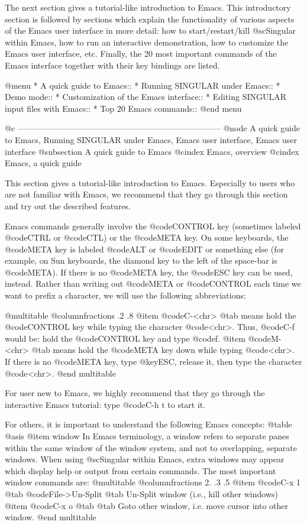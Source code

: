 The next section gives  a tutorial-like introduction to Emacs. This
introductory section is
followed by sections which explain the functionality of various aspects
of the Emacs user interface in more detail: how to start/restart/kill
@sc{Singular} within Emacs, how to run an interactive demonstration, how
to customize the Emacs user interface, etc. Finally, the 20 most
important commands of the Emacs interface together with their key
bindings are listed.

@menu
* A quick guide to Emacs::
* Running SINGULAR under Emacs::
* Demo mode::
* Customization of the Emacs interface::
* Editing SINGULAR input files with Emacs::
* Top 20 Emacs commands::
@end menu

@c --------------------------------------------------------------------------
@node A quick guide to Emacs, Running SINGULAR under Emacs, Emacs user interface, Emacs user interface
@subsection A quick guide to Emacs
@cindex Emacs, overview
@cindex Emacs, a quick guide

This section gives a tutorial-like introduction to Emacs. Especially to
users who are not familiar with Emacs, we recommend that they go through
this section and try out the described features.

Emacs commands generally involve the @code{CONTROL} key (sometimes
labeled @code{CTRL} or @code{CTL}) or the @code{META} key.  On some
keyboards, the @code{META} key is labeled @code{ALT} or @code{EDIT} or
something else (for example, on Sun keyboards, the diamond key to the
left of the space-bar is @code{META}).  If there is no @code{META} key,
the @code{ESC} key can be used, instead.  Rather than writing out
@code{META} or
@code{CONTROL} each time we want to prefix a character, we will use the
following abbreviations:

@multitable @columnfractions .2 .8
@item @code{C-<chr>}
@tab means hold the @code{CONTROL} key while typing the character
@code{<chr>}. Thus, @code{C-f} would be: hold the @code{CONTROL} key and
type @code{f}.
@item @code{M-<chr>}
@tab means hold the @code{META} key down while typing @code{<chr>}.  If there
is no @code{META} key, type @key{ESC}, release it, then type the
character @code{<chr>}.
@end multitable

For user new to Emacs, we highly recommend that they go through the
interactive Emacs tutorial: type @code{C-h t} to start it.

For others, it is important to understand the following Emacs concepts:
@table @asis
@item window
In Emacs terminology, a window refers to separate panes within the same
window of the window system, and not to overlapping, separate
windows. When using @sc{Singular} within Emacs, extra windows may appear
which display help or output from certain commands. The most important
window commands are:
@multitable @columnfractions 2. .3 .5
@item @code{C-x 1}
@tab @code{File->Un-Split}
@tab Un-Split window (i.e., kill other windows)
@item @code{C-x o}
@tab
@tab Goto other window, i.e. move cursor into other window.
@end multitable


